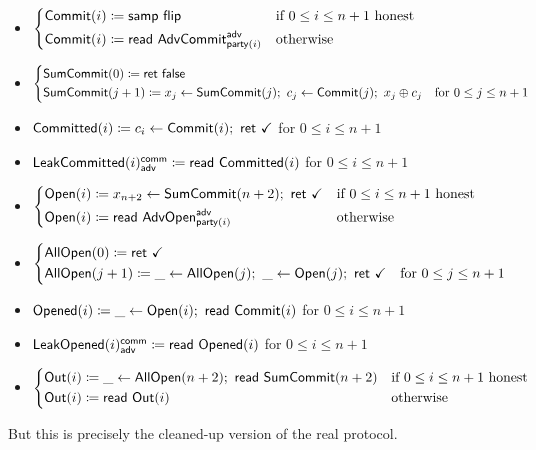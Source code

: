 \begin{itemize}
\item {\color{blue} $\begin{cases*} \Commit(i) \coloneqq \samp{\flip} & \text{if $0 \leq i \leq n+1$ honest} \\ \Commit(i) \coloneqq \read{\AdvCommit^\adv_{\party(i)}} & \text{otherwise} \end{cases*}$}
\item {\color{blue} $\begin{cases*} \SumCommit(0) \coloneqq \ret{\false} & \\ \SumCommit(j+1) \coloneqq x_j \leftarrow \SumCommit(j); \ c_j \leftarrow \Commit(j); \ x_j \oplus c_j & \text{for $0 \leq j \leq n+1$} \end{cases*}$}
\item {\color{magenta} $\mathsf{Committed}(i) \coloneqq c_i \leftarrow \mathsf{Commit}(i); \ \mathsf{ret} \ \checkmark$ for $0 \leq i \leq n+1$}
\item {\color{magenta} $\mathsf{LeakCommitted}(i)^{\mathsf{comm}}_{\mathsf{adv}} \coloneqq \mathsf{read} \ \mathsf{Committed}(i)$ for $0 \leq i \leq n+1$}
\item {\color{teal} $\begin{cases*} \Open(i) \coloneqq x_{n+2} \leftarrow \SumCommit(n+2); \ \ret{\checkmark} & \text{if $0 \leq i \leq n+1$ honest} \\ \Open(i) \coloneqq \read{\AdvOpen^\adv_{\party(i)}} & \text{otherwise} \end{cases*}$}
\item {\color{teal} $\begin{cases*} \AllOpen(0) \coloneqq \ret{\checkmark} & \\ \AllOpen(j+1) \coloneqq \_ \leftarrow \AllOpen(j); \ \_ \leftarrow \Open(j); \ \ret{\checkmark} & \text{for $0 \leq j \leq n+1$} \end{cases*}$}
\item {\color{red} $\mathsf{Opened}(i) \coloneqq \_ \leftarrow \mathsf{Open}(i); \ \mathsf{read} \ \mathsf{Commit}(i)$ for $0 \leq i \leq n+1$}
\item {\color{red} $\mathsf{LeakOpened}(i)^{\mathsf{comm}}_{\mathsf{adv}} \coloneqq \mathsf{read} \ \mathsf{Opened}(i)$ for $0 \leq i \leq n+1$}
\item $\begin{cases*} \Out(i) \coloneqq \_ \leftarrow \AllOpen(n+2); \ \read{\SumCommit(n+2)} & \text{if $0 \leq i \leq n+1$ honest} \\ \Out(i) \coloneqq \read{\Out(i)} & \text{otherwise} \end{cases*}$
\end{itemize}

\noindent But this is precisely the cleaned-up version of the real protocol.